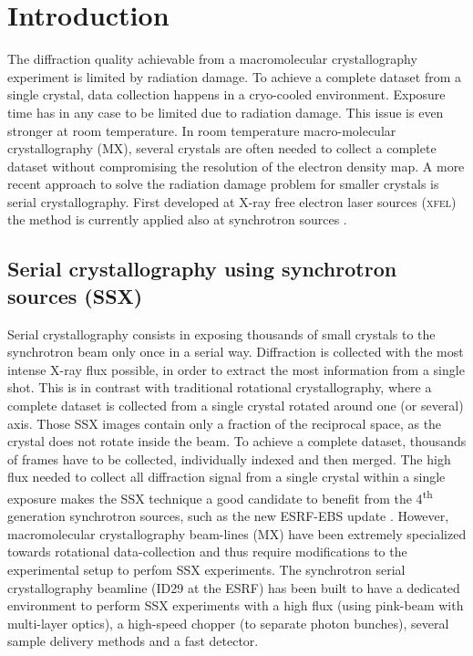 \documentclass[preprint]{iucr}              %
\begin{document}
\section{Introduction}
The diffraction quality achievable from a macromolecular crystallography experiment is limited by radiation damage.
To achieve a complete dataset from a single crystal, data collection happens in a cryo-cooled environment. 
Exposure time has in any case to be limited due to radiation damage. 
This issue is even stronger at room temperature.
In room temperature macro-molecular crystallography (MX), several crystals are often needed to collect a complete dataset without compromising the resolution of the electron density map.
A more recent approach to solve the radiation damage problem for smaller crystals is serial crystallography.
First developed at X-ray free electron laser sources (\textsc{xfel}) \cite{Chapman2011, structure_sx} the method is currently applied also at synchrotron sources  \cite{ssx, ssx_desy, ssx_id13, ssx_diamond}.

\subsection{Serial crystallography using synchrotron sources (SSX)}
%
Serial crystallography consists in exposing thousands of small crystals to the synchrotron beam only once in a serial way.
Diffraction is collected with the most intense X-ray flux possible, in order to extract the most information from a single shot.
This is in contrast with traditional rotational crystallography, where a complete dataset is collected from a single crystal rotated around one (or several) axis. 
Those SSX images contain only a fraction of the reciprocal space, as the crystal does not rotate inside the beam.
To achieve a complete dataset, thousands of frames have to be collected, individually indexed and then merged.
The high flux needed to collect all diffraction signal from a single crystal within a single exposure makes  the SSX technique a good candidate to benefit from the 4\textsuperscript{th} generation synchrotron sources, such as the new ESRF-EBS update \cite{EBS}.
However, macromolecular crystallography beam-lines (MX) have been extremely specialized towards rotational data-collection and thus require modifications to the experimental setup to perfom SSX experiments.
The synchrotron serial crystallography beamline (ID29 at the ESRF) has been built to have a dedicated environment to perform SSX experiments with a high flux (using pink-beam with multi-layer optics), a high-speed chopper (to separate photon bunches), several sample delivery methods and a fast detector.
\end{document}
